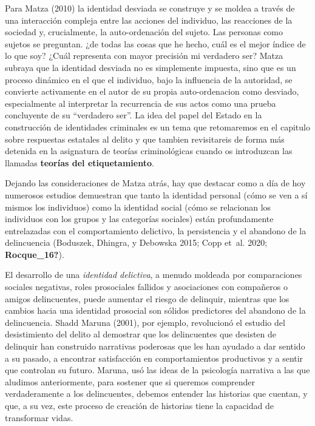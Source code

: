 \documentclass[
  spanish,
  letterpaper,
  DIV=11,
  numbers=noendperiod]{scrreprt}
\begin{document}
Para Matza (2010) la identidad desviada se construye y se moldea a
través de una interacción compleja entre las acciones del individuo, las
reacciones de la sociedad y, crucialmente, la auto-ordenación del
sujeto. Las personas como sujetos se preguntan. ¿de todas las cosas que
he hecho, cuál es el mejor índice de lo que soy? ¿Cuál representa con
mayor precisión mi verdadero ser? Matza subraya que la identidad
desviada no es simplemente impuesta, sino que es un proceso dinámico en
el que el individuo, bajo la influencia de la autoridad, se convierte
activamente en el autor de su propia auto-ordenacion como desviado,
especialmente al interpretar la recurrencia de sus actos como una prueba
concluyente de su ``verdadero ser''. La idea del papel del Estado en la
construcción de identidades criminales es un tema que retomaremos en el
capitulo sobre respuestas estatales al delito y que tambien revisitareis
de forma más detenida en la asignatura de teorías criminológicas cuando
os introduzcan las llamadas \textbf{teorías del etiquetamiento}.

Dejando las consideraciones de Matza atrás, hay que destacar como a día
de hoy numerosos estudios demuestran que tanto la identidad personal
(cómo se ven a sí mismos los individuos) como la identidad social (cómo
se relacionan los individuos con los grupos y las categorías sociales)
están profundamente entrelazadas con el comportamiento delictivo, la
persistencia y el abandono de la delincuencia (Boduszek, Dhingra, y
Debowska 2015; Copp et~al. 2020; \textbf{Rocque\_16?}).

El desarrollo de una \emph{identidad delictiva}, a menudo moldeada por
comparaciones sociales negativas, roles prosociales fallidos y
asociaciones con compañeros o amigos delincuentes, puede aumentar el
riesgo de delinquir, mientras que los cambios hacia una identidad
prosocial son sólidos predictores del abandono de la delincuencia. Shadd
Maruna (2001), por ejemplo, revolucionó el estudio del desistimiento del
delito al demostrar que los delincuentes que desisten de delinquir han
construido narrativas poderosas que les han ayudado a dar sentido a su
pasado, a encontrar satisfacción en comportamientos productivos y a
sentir que controlan su futuro. Maruna, usó las ideas de la psicología
narrativa a las que aludimos anteriormente, para sostener que si
queremos comprender verdaderamente a los delincuentes, debemos entender
las historias que cuentan, y que, a su vez, este proceso de creación de
historias tiene la capacidad de transformar vidas.
\end{document}
